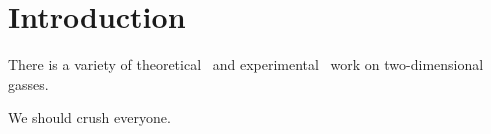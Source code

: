 \section{Introduction}\label{sec:intro}

There is a variety of theoretical~\cite{PhysRevA.103.L061303,2112.09232} and experimental~\cite{PhysRevLett.124.240403,2106.11893} work on two-dimensional gasses.

We should crush everyone.

